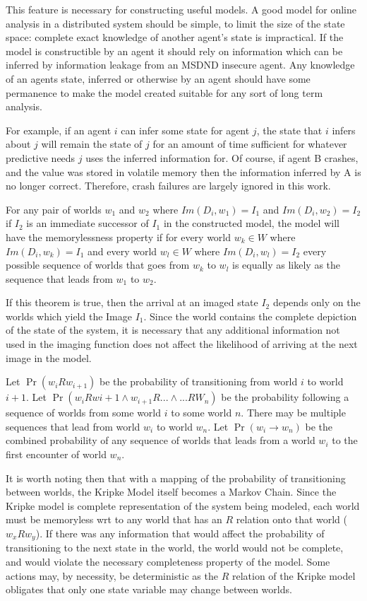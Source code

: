 This feature is necessary for constructing useful models. A good model for online analysis in a distributed system should be simple, to limit the size of the state space: complete exact knowledge of another agent's state is impractical. If the model is constructible by an agent it should rely on information which can be inferred by information leakage from an MSDND insecure agent. Any knowledge of an agents state, inferred or otherwise by an agent should have some permanence to make the model created suitable for any sort of long term analysis. 

For example, if an agent $i$ can infer some state for agent $j$, the state that $i$ infers about $j$ will remain the state of $j$ for an amount of time sufficient for whatever predictive needs $j$ uses the inferred information for. Of course, if agent B crashes, and the value was stored in volatile memory then the information inferred by A is no longer correct. Therefore, crash failures are largely ignored in this work.

\begin{thm}
For any pair of worlds $w_1$ and $w_2$ where $Im(D_i, w_1)=I_1$ and $Im(D_i, w_2)=I_2$ if $I_2$ is an immediate successor of $I_1$ in the constructed model, the model will have the memorylessness property if for every world $w_k \in W$ where $Im(D_i, w_k)=I_1$ and every world $w_l \in W$ where $Im(D_i, w_l)=I_2$ every possible sequence of worlds that goes from $w_k$ to $w_l$ is equally as likely as the sequence that leads from $w_1$ to $w_2$. 
\end{thm}

If this theorem is true, then the arrival at an imaged state $I_2$ depends only on the worlds which yield the Image $I_1$. Since the world contains the complete depiction of the state of the system, it is necessary that any additional information not used in the imaging function does not affect the likelihood of arriving at the next image in the model.

Let $\Pr(w_{i}Rw_{i+1})$ be the probability of transitioning from world $i$ to world $i+1$. Let $\Pr(w_{i}Rw{i+1} \wedge w_{i+1}R... \wedge ...RW_{n})$ be the probability following a sequence of worlds from some world $i$ to some world $n$. There may be multiple sequences that lead from world $w_i$ to world $w_n$. Let $\Pr(w_i \rightarrow w_n)$ be the combined probability of any sequence of worlds that leads from a world $w_i$ to the first encounter of world $w_n$.

It is worth noting then that with a mapping of the probability of transitioning between worlds, the Kripke Model itself becomes a Markov Chain.
Since the Kripke model is complete representation of the system being modeled, each world must be memoryless wrt to any world that has an $R$ relation onto that world ($w_xRw_y$).
If there was any information that would affect the probability of transitioning to the next state in the world, the world would not be complete, and would violate the necessary completeness property of the model.
Some actions may, by necessity, be deterministic as the $R$ relation of the Kripke model obligates that only one state variable may change between worlds.

